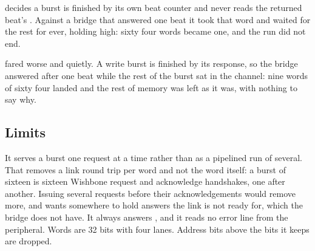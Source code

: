  decides a burst is finished by its own beat counter
and never reads the returned beat's . Against a bridge
that answered one beat it took that word and waited for the rest for
ever, holding  high: sixty four words became one, and
the run did not end.

 fared worse and quietly. A write burst is finished
by its response, so the bridge answered after one beat while the rest
of the burst sat in the channel: nine words of sixty four landed and
the rest of memory was left as it was, with nothing to say why.

\subsection*{Limits}

It serves a burst one request at a time rather than as a pipelined
run of several. That removes a link round trip per word and not the
word itself: a burst of sixteen is sixteen Wishbone request and
acknowledge handshakes, one after another. Issuing several requests
before their acknowledgements would remove more, and wants somewhere
to hold answers the link is not ready for, which the bridge does not
have. It always answers , and it reads no
error line from the peripheral. Words are 32 bits with four lanes.
Address bits above the  bits it keeps are dropped.
